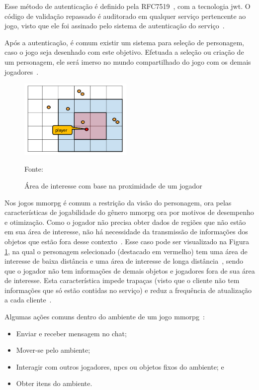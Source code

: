 Esse método de autenticação é definido pela RFC7519~\cite{rfc7519}, com a tecnologia \ac{jwt}.
%
O código de validação repassado é auditorado em qualquer serviço pertencente ao jogo, visto que ele foi assinado pelo sistema de autenticação do serviço~\cite{Ikem2018May}.


Após a autenticação, é comum existir um sistema para seleção de personagem, caso o jogo seja desenhado com este objetivo.
%
Efetuada a seleção ou criação de um personagem, ele será imerso no mundo compartilhado do jogo com os demais jogadores~\cite{matthiasrudy2011}.


\begin{figure}[htb!]
\caption{Área de interesse com base na proximidade de um jogador}
\label{fig:proximidade}
\includegraphics[height=3.8cm]{img/cap2/proximidade.png}
\centering

Fonte:~\cite{albion_online_unite}
\end{figure}



Nos jogos \ac{mmorpg} é comum a restrição da visão do personagem, ora pelas características de jogabilidade do gênero \ac{mmorpg} ora por motivos de desempenho e otimização.
%
Como o jogador não precisa obter dados de regiões que não estão em sua área de interesse, não há necessidade da transmissão de informações dos objetos que estão fora desse contexto~\cite{albion_online_unite}.
%
Esse caso pode ser visualizado na Figura \ref{fig:proximidade}, na qual o personagem selecionado (destacado em vermelho) tem uma área de interesse de baixa distância e uma área de interesse de longa distância~\cite{albion_online_unite}, sendo que o jogador não tem informações de demais objetos e jogadores fora de sua área de interesse.
%
Esta característica impede trapaças (visto que o cliente não tem informações que só estão contidas no serviço) e reduz a frequência de atualização a cada cliente~\cite{albion_online_unite}.



Algumas ações comuns dentro do ambiente de um jogo \ac{mmorpg}~\cite{mmorpg_culture}:

\begin{itemize}
  \item Enviar e receber mensagem no chat;
  \item Mover-se pelo ambiente;
  \item Interagir com outros jogadores, \ac{npcs} ou objetos fixos do ambiente; e
  \item Obter itens do ambiente.
\end{itemize}



